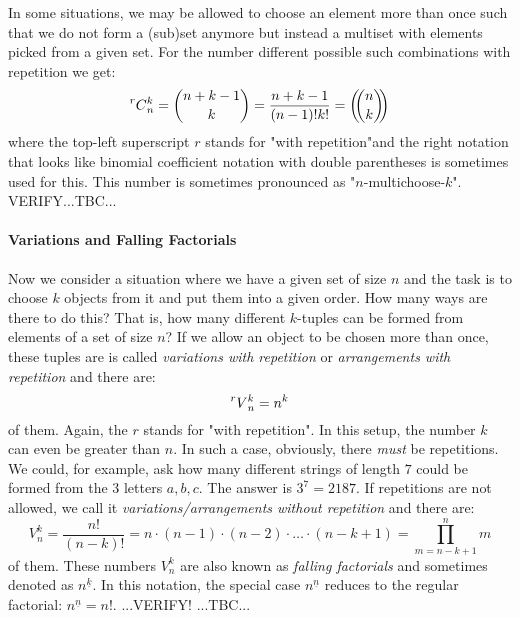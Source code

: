 \medskip
In some situations, we may be allowed to choose an element more than once such that we do not form a (sub)set anymore but instead a multiset with elements picked from a given set. For the number different possible such combinations with repetition we get:
\begin{equation}
\prescript{r}{}{C}_n^k
= \binom{n+k-1}{k}
= \frac{n+k-1}{(n-1)! k!}
= \left(\!\!{n\choose k}\!\!\right)
\end{equation}
where the top-left superscript $r$ stands for "with repetition"and the right notation that looks like binomial coefficient notation with double parentheses is sometimes used for this. This number is sometimes pronounced as "$n$-multichoose-$k$". VERIFY...TBC...





\paragraph{Variations and Falling Factorials}
Now we consider a situation where we have a given set of size $n$ and the task is to choose $k$ objects from it and put them into a given order. How many ways are there to do this? That is, how many different $k$-tuples can be formed from elements of a set of size $n$? If we allow an object to be chosen more than once, these tuples are is called \emph{variations with repetition} or \emph{arrangements with repetition} and there are:
\begin{equation}
\prescript{r}{}{V}_n^k = n^k
\end{equation}
of them. Again, the $r$ stands for "with repetition". In this setup, the number $k$ can even be greater than $n$. In such a case, obviously, there \emph{must} be repetitions. We could, for example, ask how many different strings of length $7$ could be formed from the $3$ letters $a,b,c$. The answer is $3^7 = 2187$. If repetitions are not allowed, we call it \emph{variations/arrangements without repetition} and there are:
\begin{equation}
V_n^k = \frac{n!}{(n-k)!} 
      = n \cdot (n-1) \cdot (n-2) \cdot \ldots \cdot (n-k+1) 
      = \prod_{m=n-k+1}^{n} m
\end{equation}
of them. These numbers $V_n^k$ are also known as \emph{falling factorials} and sometimes denoted as $n^{\underline{k}}$. In this notation, the special case  $n^{\underline{n}}$ reduces to the regular factorial: $n^{\underline{n}} = n!$. ...VERIFY! ...TBC...

